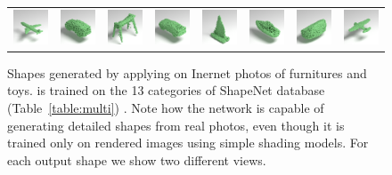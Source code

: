 \begin{figure}[t]
\begin{tabular}{cccccccc}
\includegraphics[width=.12\linewidth]{rendering/playdoh_shapes/plane3_mrt_v1.png} &
\includegraphics[width=.12\linewidth]{rendering/playdoh_shapes/car8_clipped_rev_1_mrt_v1.png} &
\includegraphics[width=.12\linewidth]{rendering/playdoh_shapes/5701697_clipped_rev_1_mrt_v1.png} &
\includegraphics[width=.12\linewidth]{rendering/playdoh_shapes/cara_clipped_rev_1_mrt_v1.png} &
\includegraphics[width=.12\linewidth]{rendering/playdoh_shapes/ship9_mrt_v1.png} &
\includegraphics[width=.12\linewidth]{rendering/playdoh_shapes/ship3_mrt_v1.png} &
\includegraphics[width=.12\linewidth]{rendering/playdoh_shapes/Play-Doh-Sofa_clipped_rev_1_mrt_v1.png} &
\includegraphics[width=.12\linewidth]{rendering/playdoh_shapes/plane2_mrt_v1.png} \\

\end{tabular}
\vspace{-8pt}
    \caption{\label{fig:real} 
    \small Shapes generated by applying \mrtnet on Inernet photos of furnitures and toys. \mrtnet is trained on the 13 categories of ShapeNet database (Table~\ref{table:multi}) . Note how the network is capable of generating detailed shapes from real photos, even though it is trained only on rendered images using simple shading models. For each output shape we show two different views.
    }
\vspace{-18pt}
\end{figure}

